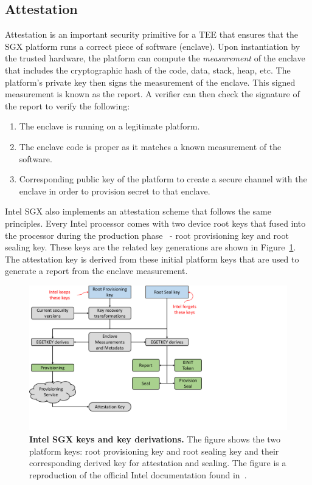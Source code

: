 \subsection{Attestation}
\label{ch:background:SGX:attestation}

Attestation is an important security primitive for a TEE that ensures that the SGX platform runs a correct piece of software (enclave). Upon instantiation by the trusted hardware, the platform can compute the \emph{measurement} of the enclave that includes the cryptographic hash of the code, data, stack, heap, etc. The platform's private key then signs the measurement of the enclave. This signed measurement is known as the report. A verifier can then check the signature of the report to verify the following:

\begin{enumerate}
  \item The enclave is running on a legitimate platform.
  \item The enclave code is proper as it matches a known measurement of the software.
  \item Corresponding public key of the platform to create a secure channel with the enclave in order to provision secret to that enclave.
\end{enumerate}  

Intel SGX also implements an attestation scheme that follows the same principles. Every Intel processor comes with two device root keys that fused into the processor during the production phase~\cite{attestation_primitive} -  root provisioning key and root sealing key. These keys are the related key generations are shown in Figure~\ref{fig:keys_bg}. The attestation key is derived from these initial platform keys that are used to generate a report from the enclave measurement.


\begin{figure}[t]
  \centering
    \includegraphics[trim={0 1cm 10cm 0},clip,width=0.9\linewidth]{chapters/background/figures/keys.pdf}
    \caption[Intel SGX keys and key derivations]{\textbf{Intel SGX keys and key derivations.} The figure shows the two platform keys: root provisioning key and root sealing key and their corresponding derived key for attestation and sealing. The figure is a reproduction of the official Intel documentation found in~\cite{attestation_primitive}.}
    \label{fig:keys_bg}
\end{figure}


